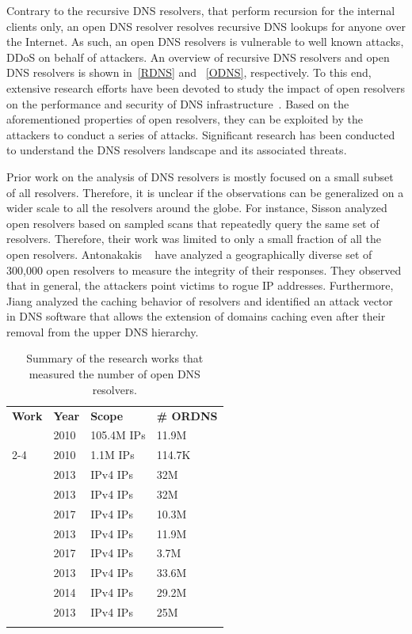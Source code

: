 Contrary to the recursive DNS resolvers, that perform recursion for the internal clients only, an open DNS resolver resolves recursive DNS lookups for anyone over the Internet. As such, an open DNS resolvers is vulnerable to well known attacks, \eg DDoS on behalf of attackers. An overview of recursive DNS resolvers and open DNS resolvers is shown in~\autoref{RDNS} and ~\autoref{ODNS}, respectively. To this end, extensive research efforts have been devoted to study the impact of open resolvers on the performance and security of DNS infrastructure~. 
Based on the aforementioned properties of open resolvers, they can be exploited by the attackers to conduct a series of attacks. Significant research has been conducted to understand the DNS resolvers landscape and its associated threats.

Prior work on the analysis of DNS resolvers is mostly focused on a small subset of all resolvers. Therefore, it is unclear if the observations can be generalized on a wider scale to all the resolvers around the globe. For instance, Sisson  analyzed open resolvers based on sampled scans that repeatedly query the same set of resolvers. Therefore, their work was limited to only a small fraction of all the open resolvers. Antonakakis \etal~ have analyzed a geographically diverse set of 300,000 open resolvers to measure the integrity of their responses. They observed that in general, the attackers point victims to rogue IP addresses. Furthermore, Jiang \etal  analyzed the caching behavior of resolvers and identified an attack vector in DNS software that allows the extension of domains caching even after their removal from the upper DNS hierarchy. 
\begin{table}[t]
\begin{center}
\small
\caption{Summary of the research works that measured the number of open DNS resolvers.}
\label{tab:SumORDNS}
\begin{tabular}{llll}
\Xhline{2\arrayrulewidth}
\textbf{Work}  & \textbf{Year} & \textbf{Scope} & \textbf{\# ORDNS}    \\
\Xhline{2\arrayrulewidth}
\multirow{2}{*}{} & 2010&  105.4M IPs  & 11.9M   \\ \cline{2-4}
  & 2010& 1.1M  IPs & 114.7K  \\ \hline
 & 2013 &  IPv4 IPs  & 32M  \\ \hline
\multirow{2}{*}{} & 2013 &  IPv4 IPs  & 32M \\ \cline{2-4}
 & 2017 &  IPv4 IPs  & 10.3M  \\ \hline
\multirow{2}{*}{} & 2013 & IPv4 IPs  & 11.9M  \\\cline{2-4} 
 & 2017 & IPv4 IPs  & 3.7M  \\ \hline
\multirow{2}{*}{} & 2013 & IPv4 IPs  & 33.6M  \\\cline{2-4} 
 & 2014 & IPv4 IPs  & 29.2M  \\ \hline
 & 2013 & IPv4 IPs & 25M \\ 
\Xhline{2\arrayrulewidth}
\end{tabular}
\end{center}
\end{table}

